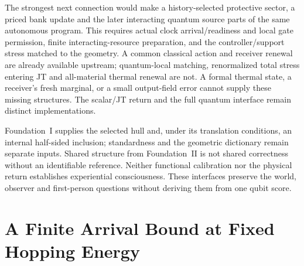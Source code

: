 \documentclass[12pt]{article}
\theoremstyle{definition}
\theoremstyle{remark}
\begin{document}
The strongest next connection would make a history-selected protective
sector, a priced bank update and the later interacting quantum source
parts of the same autonomous program. This requires actual clock
arrival/readiness and local gate permission, finite interacting-resource
preparation, and the controller/support stress matched to the geometry.
A common classical action and receiver renewal are already available
upstream; quantum-local matching, renormalized total stress entering JT
and all-material thermal renewal are not. A formal thermal state, a
receiver's fresh marginal, or a small output-field error cannot supply
these missing structures. The scalar/JT return and the full quantum
interface remain distinct implementations.

Foundation~I supplies the selected hull and, under its translation
conditions, an internal half-sided inclusion; standardness and the
geometric dictionary remain separate inputs. Shared structure from
Foundation~II is not shared correctness without an identifiable
reference. Neither functional calibration nor the physical return
establishes experiential consciousness. These interfaces preserve the
world, observer and first-person questions without deriving them from
one qubit score.

\appendix
\section{A Finite Arrival Bound at Fixed Hopping Energy}\label{app:arrival}
\end{document}
